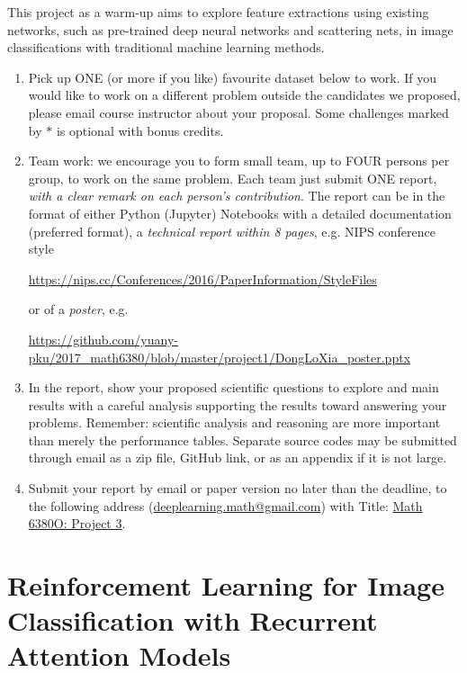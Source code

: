 \documentclass[11pt]{article}
\begin{document}
This project as a warm-up aims to explore feature extractions using existing networks, such as pre-trained deep neural networks and scattering nets, in image classifications with traditional machine learning methods.
\begin{enumerate}
\item Pick up ONE (or more if you like) favourite dataset below to work. If you would like to work on a different problem outside the candidates we proposed, please email course instructor about your proposal.  Some challenges marked by $*$ is optional with bonus credits. 
\item Team work: we encourage you to form small team, up to FOUR persons per group, to work on the same problem. Each team just submit ONE report, \emph{with a clear remark on each person's contribution}. The report can be in the format of either Python (Jupyter) Notebooks with a detailed documentation (preferred format), a \emph{technical report within 8 pages}, e.g. NIPS conference style 
\begin{center}
\url{https://nips.cc/Conferences/2016/PaperInformation/StyleFiles} 
\end{center}
or of a \emph{poster}, e.g. 
\begin{center}%
\url{https://github.com/yuany-pku/2017_math6380/blob/master/project1/DongLoXia_poster.pptx}
\end{center}
\item In the report, show your proposed scientific questions to explore and main results with a careful analysis supporting the results toward answering your problems. Remember: scientific analysis and reasoning are more important than merely the performance tables. Separate source codes may be submitted through email as a zip file, GitHub link, or as an appendix if it is not large.    
\item Submit your report by email or paper version no later than the deadline, to the following address (\href{mailto:deeplearning.math@gmail.com}{deeplearning.math@gmail.com}) with Title: \underline{Math 6380O: Project 3}. %
\end{enumerate}

\section{Reinforcement Learning for Image Classification with Recurrent Attention Models} 
\end{document}
